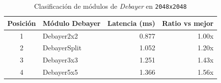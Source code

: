 \begin{table}[htbp]
\centering
\renewcommand{\arraystretch}{1.2}
\setlength{\tabcolsep}{8pt}
\begin{tabular}{|c|l|r|r|}
\hline
\rowcolor[gray]{0.90}
\textbf{Posición} & \textbf{Módulo Debayer} & \textbf{Latencia (ms)} & \textbf{Ratio vs mejor} \\
\hline
1 & Debayer2x2 & 0.877 & 1.00x \\
\hline
2 & DebayerSplit & 1.052 & 1.20x \\
\hline
3 & Debayer3x3 & 1.251 & 1.43x \\
\hline
4 & Debayer5x5 & 1.366 & 1.56x \\
\hline
\end{tabular}
\caption{Clasificación de módulos de \textit{Debayer} en \texttt{2048x2048}}
\label{tab:debayer_gpu_ranking_2048_equipo1_float32}
\end{table}
